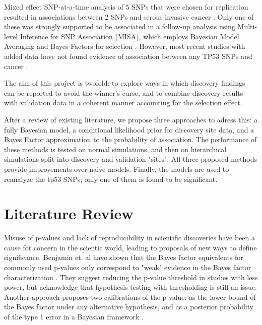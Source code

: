 \documentclass[AMA,STIX1COL]{WileyNJD-v2}\usepackage[]{graphicx}\usepackage[]{color}
\begin{document}
Mixed effect SNP-at-a-time analysis of 5 SNPs that were chosen for replication resulted in associations between 2 SNPs and serous invasive cancer \cite{Schildkraut2349}. Only one of these was strongly supported to be associated in a follow-up analysis using Multi-level Inference for SNP Association (MISA), which employs Bayesian Model Averaging and Bayes Factors for selection \cite{schildkraut2010association}. However, most recent studies with added data have not found evidence of association between any TP53 SNPs and cancer \cite{phelan2017identification}.

The aim of this project is twofold: to explore ways in which discovery findings can be reported to avoid the winner's curse, and to combine discovery results with validation data in a coherent manner accounting for the selection effect. 

After a review of existing literature, we propose three approaches to adress this: a fully Bayesian model, a conditional likelihood prior for discovery site data, and a Bayes Factor approximation to the probability of association. The performance of these methods is tested on normal simulations, and then on hierarchical simulations split into discovery and validation "sites". All three proposed methods provide improvements over naive models. Finally, the models are used to reanalyze the tp53 SNPs; only one of them is found to be significant.

\section{Literature Review}\label{sec:lit}

Misuse of p-values and lack of reproducibility in scientific discoveries have been a cause for concern in the scientic world, leading to proposals of new ways to define significance. Benjamin et. al have shown that the Bayes factor equivalents for commonly used p-values only correspond to "weak" evidence in the Bayes factor characterization \cite{benjamin2017redefine}. They suggest reducing the p-value threshold in studies with less power, but acknowledge that hypothesis testing with thresholding is still an issue. Another approach proposes two calibrations of the p-value: as the lower bound of the Bayes factor under any alternative hypothesis, and as a posterior probability of the type 1 error in a Bayesian framework \cite{sellke2001calibration}.
\end{document}
